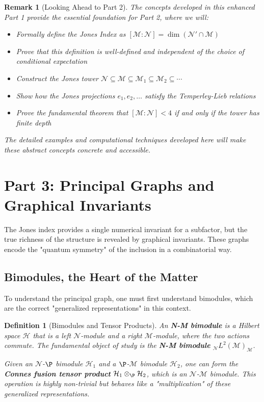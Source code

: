 \documentclass[11pt, a4paper]{article}
\theoremstyle{colored_def}
\newtheorem{definition}{Definition}[section]
\theoremstyle{colored_thm}
\theoremstyle{colored_ex}
\newtheorem{remark}[example]{Remark}
\newcommand{\M}{\mathcal{M}}
\newcommand{\N}{\mathcal{N}}
\newcommand{\Hil}{\mathcal{H}}
\begin{document}
\begin{remark}[Looking Ahead to Part 2]
The concepts developed in this enhanced Part 1 provide the essential foundation for Part 2, where we will:
\begin{itemize}
    \item Formally define the Jones Index as $[\M : \N] = \dim(\N' \cap \M)$
    \item Prove that this definition is well-defined and independent of the choice of conditional expectation
    \item Construct the Jones tower $\N \subseteq \M \subseteq \M_1 \subseteq \M_2 \subseteq \cdots$
    \item Show how the Jones projections $e_1, e_2, \ldots$ satisfy the Temperley-Lieb relations
    \item Prove the fundamental theorem that $[\M : \N] < 4$ if and only if the tower has finite depth
\end{itemize}

The detailed examples and computational techniques developed here will make these abstract concepts concrete and accessible.
\end{remark}

\clearpage
\section{Part 3: Principal Graphs and Graphical Invariants}\label{sec:part3}

The Jones index provides a single numerical invariant for a subfactor, but the true richness of the structure is revealed by graphical invariants. These graphs encode the "quantum symmetry" of the inclusion in a combinatorial way.

\subsection{Bimodules, the Heart of the Matter}

To understand the principal graph, one must first understand bimodules, which are the correct "generalized representations" in this context.

\begin{definition}[Bimodules and Tensor Products]
An \textbf{N-M bimodule} is a Hilbert space $\Hil$ that is a left $\N$-module and a right $\M$-module, where the two actions commute. The fundamental object of study is the \textbf{N-M bimodule} $_\N L^2(\M)_\M$.

Given an $\N$-$\P$ bimodule $\Hil_1$ and a $\P$-$\M$ bimodule $\Hil_2$, one can form the \textbf{Connes fusion tensor product} $\Hil_1 \otimes_\P \Hil_2$, which is an $\N$-$\M$ bimodule. This operation is highly non-trivial but behaves like a "multiplication" of these generalized representations.
\end{definition}
\end{document}
